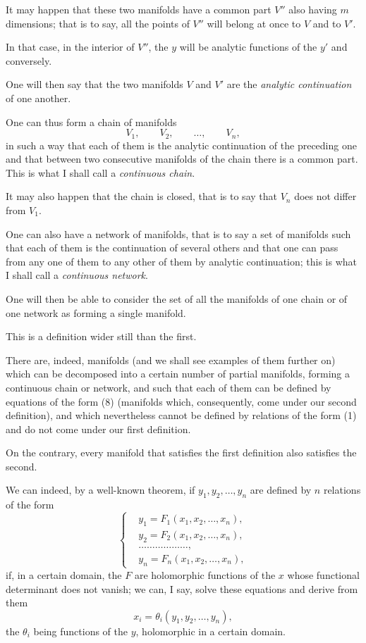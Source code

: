 \documentclass{article}
\begin{document}
It may happen that these two manifolds have a common part $V''$ also having $m$ dimensions; that is to say, all the points of $V''$ will belong at once to $V$ and to $V'$.

In that case, in the interior of $V''$, the $y$ will be analytic functions of the $y'$ and conversely.

One will then say that the two manifolds $V$ and $V'$ are the \emph{analytic continuation} of one another.

One can thus form a chain of manifolds
\[
V_{1}, \qquad V_{2}, \qquad \ldots, \qquad V_{n},
\]
in such a way that each of them is the analytic continuation of the
preceding one and that between two consecutive manifolds of the chain there is a common part. This is what I shall call a \emph{continuous chain}.

It may also happen that the chain is closed, that is to say that $V_{n}$ does not differ from $V_{1}$.

One can also have a network of manifolds, that is to say a set of manifolds such that each of them is the continuation of several others and that one can pass from any one of them to any other of them by analytic continuation; this is what I shall call a \emph{continuous network}.

One will then be able to consider the set of all the manifolds of one chain or of one network as forming a single manifold.

This is a definition wider still than the first.

There are, indeed, manifolds (and we shall see examples of them further on) which can be decomposed into a certain number of partial manifolds, forming a continuous chain or network, and such that each of them can be defined by equations of the form (8) (manifolds which, consequently, come under our second definition), and which nevertheless cannot be defined by relations of the form (1) and do not come under our first definition.

On the contrary, every manifold that satisfies the first definition also satisfies the second.

We can indeed, by a well-known theorem, if $y_{1}, y_{2}, \ldots, y_{n}$ are defined by $n$ relations of the form
\[
\left\{
\begin{aligned}
&y_{1} = F_{1}(x_{1}, x_{2}, \ldots, x_{n}),\\
&y_{2} = F_{2}(x_{1}, x_{2}, \ldots, x_{n}),\\
&\ldots\ldots\ldots\ldots\ldots\ldots,\\
&y_{n} = F_{n}(x_{1}, x_{2}, \ldots, x_{n}),
\end{aligned}
\right.
\tag{$\alpha$}
\]
if, in a certain domain, the $F$ are holomorphic functions of the $x$ whose functional determinant does not vanish; we can, I say, solve these equations and derive from them
\[
x_{i} = \theta_{i}(y_{1}, y_{2}, \ldots, y_{n}),
\tag{$\beta$}
\]
the $\theta_{i}$ being functions of the $y$, holomorphic in a certain domain.
\end{document}
